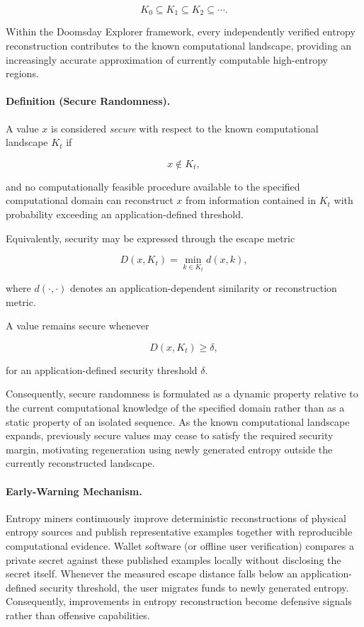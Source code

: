 \documentclass[11pt]{article}
\begin{document}
\[
K_0
\subseteq
K_1
\subseteq
K_2
\subseteq
\cdots.
\]

Within the Doomsday Explorer framework,
every independently verified entropy reconstruction contributes to the
known computational landscape,
providing an increasingly accurate approximation of currently
computable high-entropy regions.


\paragraph{Definition (Secure Randomness).}

A value \(x\) is considered \emph{secure} with respect to the known
computational landscape \(K_t\) if

\[
x
\notin
K_t,
\]

and no computationally feasible procedure available to the specified
computational domain can reconstruct \(x\) from information contained
in \(K_t\) with probability exceeding an application-defined
threshold.

Equivalently,
security may be expressed through the escape metric

\[
D(x,K_t)
=
\min_{k\in K_t}
d(x,k),
\]

where \(d(\cdot,\cdot)\) denotes an application-dependent similarity
or reconstruction metric.

A value remains secure whenever

\[
D(x,K_t)
\ge
\delta,
\]

for an application-defined security threshold \(\delta\).

Consequently,
secure randomness is formulated as a dynamic property relative to the
current computational knowledge of the specified domain rather than as
a static property of an isolated sequence.
As the known computational landscape expands,
previously secure values may cease to satisfy the required security
margin,
motivating regeneration using newly generated entropy outside the
currently reconstructed landscape.


\paragraph{Early-Warning Mechanism.}

Entropy miners continuously improve deterministic reconstructions of
physical entropy sources and publish representative examples together
with reproducible computational evidence.
Wallet software (or offline user verification) compares a private
secret against these published examples locally without disclosing the
secret itself.
Whenever the measured escape distance falls below an application-defined
security threshold,
the user migrates funds to newly generated entropy.
Consequently,
improvements in entropy reconstruction become defensive signals rather
than offensive capabilities.
\end{document}
